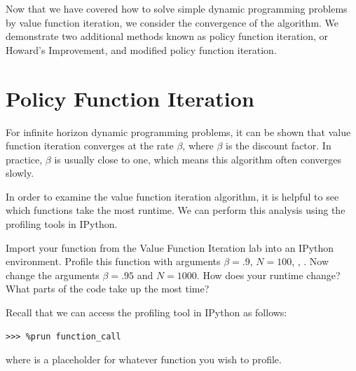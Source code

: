 
Now that we have covered how to solve simple dynamic programming problems by value function iteration, we consider
the convergence of the algorithm.  We demonstrate two additional methods known as policy function iteration, or Howard's
Improvement, and modified policy function iteration.

\section*{Policy Function Iteration}
For infinite horizon dynamic programming problems, it can be shown that value function iteration converges at the
rate $\beta$, where $\beta$ is the discount factor.  In practice, $\beta$ is usually close to one, which means this
algorithm often converges slowly.

In order to examine the value function iteration algorithm, it is helpful to see which functions take the most runtime.
We can perform this analysis using the profiling tools in IPython.
\begin{problem}
\label{prob:profile}
Import your function  from the Value Function Iteration lab into an IPython environment.
Profile this function with arguments $\beta = .9$, $N = 100$, , .
Now change the arguments $\beta = .95$ and $N = 1000$.
How does your runtime change? What parts of the code take up the most time?

Recall that we can access the profiling tool in IPython as follows:
\begin{lstlisting}
>>> %prun function_call
\end{lstlisting}
where  is a placeholder for whatever function you wish to profile.
\end{problem}


